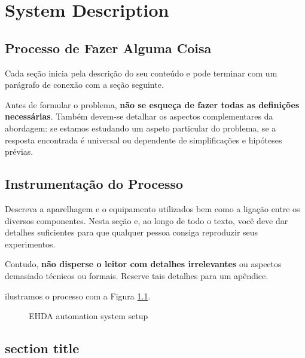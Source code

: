 \chapter[System Description]{System Description}
\label{chap:descricaoproblema}


\section{Processo de Fazer Alguma Coisa}
\label{sec:hist}

Cada seção inicia pela descrição do seu conteúdo e pode terminar com um parágrafo de conexão com a seção seguinte. 

Antes de formular o problema, \textbf{não se esqueça de fazer todas as definições necessárias}. Também devem-se detalhar os aspectos complementares da abordagem: se estamos estudando um aspeto particular do problema, se a resposta encontrada é universal ou dependente de simplificações e hipóteses prévias.


\section{Instrumentação do Processo}
\label{sec:instrumentação}

Descreva a aparelhagem e o equipamento utilizados bem como a ligação entre os diversos componentes. Nesta seção e, ao longo de todo o texto, você deve dar detalhes suficientes para que qualquer pessoa consiga reproduzir seus experimentos.

Contudo, \textbf{não disperse o leitor com detalhes irrelevantes} ou aspectos
demasiado técnicos ou formais. Reserve tais detalhes para um
apêndice.

ilustramos o processo com a Figura \ref{fig:setup}. 

\begin{figure}[thpb]
  \centering
  \caption{EHDA automation system setup}
  \label{fig:setup}
\end{figure}


\section{section title}
\label{sec:revisão}


\clearpage
